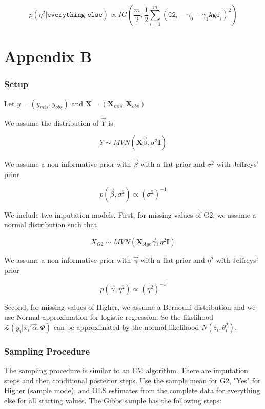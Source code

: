 \documentclass[11pt]{article}
\begin{document}
$$p(\eta^2 | \texttt{everything else}) \propto IG \left(
\frac{m}{2},
\frac{1}{2}\sum_{i=1}^m (\texttt{G2}_i - \gamma_0 - \gamma_1\texttt{Age}_i)^2
\right)$$


\newpage
\section{Appendix B}

\subsubsection{Setup}

Let $y = (y_{mis}, y_{obs})$ and $\mathbf{X} = (\mathbf{X}_{mis}, \mathbf{X}_{obs})$

We assume the distribution of $\vec{Y}$ is

$$Y \sim MVN(\mathbf{X}\vec{\beta}, \sigma^2\mathbf{I})$$

We assume a non-informative prior with $\vec{\beta}$ with a flat prior and $\sigma^2$ with Jeffreys' prior

$$p(\vec{\beta}, \sigma^2) \propto (\sigma^2)^{-1}$$

\vspace{0.25in}

We include two imputation models. First, for missing values of G2, we assume a normal distribution such that

$$X_{G2} \sim MVN(\mathbf{X}_{Age}\vec{\gamma}, \eta^2\mathbf{I})$$

We assume a non-informative prior with $\vec{\gamma}$ with a flat prior and $\eta^2$ with Jeffreys' prior

$$p(\vec{\gamma}, \eta^2) \propto (\eta^2)^{-1}$$

\vspace{0.25in}

Second, for missing values of Higher, we assume a Bernoulli distribution and we use Normal approximation for logistic regression. So the likelihood $\mathcal{L}(y_i|x_i'\vec\alpha, \Phi)$ can be approximated by the normal likelihood $N(z_i, \theta^2_i)$.

\subsubsection{Sampling Procedure}

The sampling procedure is similar to an EM algorithm. There are imputation steps and then conditional posterior steps. Use the sample mean for G2, "Yes" for Higher (sample mode), and OLS estimates from the complete data for everything else for all starting values. The Gibbs sample has the following steps:
\end{document}
